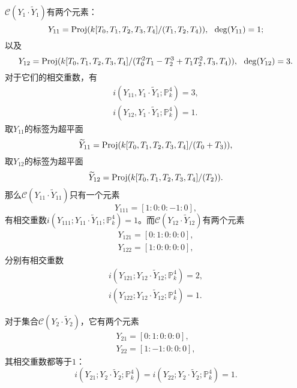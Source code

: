 \begin{example}
$\mathcal{C}(Y_1\cdot\widetilde{Y}_1)$有两个元素：
\begin{equation}
Y_{11} = \operatorname{Proj}(k[T_0,T_1,T_2,T_3,T_4] / (T_1, T_2, T_4)), ~~ \deg(Y_{11}) = 1;
\end{equation}
以及
\begin{equation}
Y_{12} = \operatorname{Proj}(k[T_0,T_1,T_2,T_3,T_4] / (T_0^2T_1 - T_2^3 + T_1T_2^2, T_3, T_4)), ~~ \deg(Y_{12}) = 3.
\end{equation}
对于它们的相交重数，有
\begin{gather}
i(Y_{11}, Y_1\cdot\widetilde{Y}_1; \mathbb{P}_k^4) = 3, \\
i(Y_{12}, Y_1\cdot\widetilde{Y}_1; \mathbb{P}_k^4) = 1.
\end{gather}
取$Y_{11}$的标签为超平面
\begin{equation}
\widetilde{Y}_{11} = \operatorname{Proj}(k[T_0,T_1,T_2,T_3,T_4] / (T_0+T_3)),
\end{equation}
取$Y_{12}$的标签为超平面
\begin{equation}
\widetilde{Y}_{12} = \operatorname{Proj}(k[T_0,T_1,T_2,T_3,T_4] / (T_2)).
\end{equation}
那么$\mathcal{C}(Y_{11}\cdot \widetilde{Y}_{11})$只有一个元素
\begin{equation}
Y_{111} = [1:0:0:-1:0],
\end{equation}
有相交重数$i(Y_{111}; Y_{11}\cdot \widetilde{Y}_{11}; \mathbb{P}_k^4) = 1$。而$\mathcal{C}(Y_{12}\cdot \widetilde{Y}_{12})$有两个元素
\begin{gather}
Y_{121} = [0:1:0:0:0], \\
Y_{122} = [1:0:0:0:0],
\end{gather}
分别有相交重数
\begin{gather}
i(Y_{121}; Y_{12}\cdot \widetilde{Y}_{12}; \mathbb{P}_k^4) = 2, \\
i(Y_{122}; Y_{12}\cdot \widetilde{Y}_{12}; \mathbb{P}_k^4) = 1.
\end{gather}

对于集合$\mathcal{C}(Y_2\cdot\widetilde{Y}_2)$，它有两个元素
\begin{gather}
Y_{21} = [0:1:0:0:0], \\
Y_{22} = [1:-1:0:0:0],
\end{gather}
其相交重数都等于$1$：
\begin{equation}
i(Y_{21}; Y_{2}\cdot \widetilde{Y}_{2}; \mathbb{P}_k^4) = i(Y_{22}; Y_{2}\cdot \widetilde{Y}_{2}; \mathbb{P}_k^4) = 1.
\end{equation}


\end{example}
